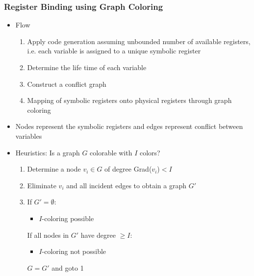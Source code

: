 \subsubsection{Register Binding using Graph Coloring}
\begin{itemize}
	\item Flow
\begin{enumerate}
  \item Apply code generation assuming unbounded number of available registers, i.e. each variable is assigned to a unique symbolic register
  \item Determine the life time of each variable 
  \item Construct a conflict graph
  \item Mapping of symbolic registers onto physical registers through graph coloring 
\end{enumerate}
\item Nodes represent the symbolic registers and edges represent conflict between variables 
\item Heuristics: Is a graph $G$ colorable with $I$ colors?
\begin{enumerate}
  \item Determine a node $v_i \in G$ of degree Grad($v_i$)$<I$
  \item Eliminate $v_i$ and all incident edges to obtain a graph $G'$
  \item If $G'=\emptyset$:
\begin{itemize}
	\item $I$-coloring possible
\end{itemize}
  If all nodes in $G'$ have degree $\geq I$:
  \begin{itemize}
	\item $I$-coloring not possible
\end{itemize}
  $G=G'$ and goto 1
\end{enumerate}

\end{itemize}

